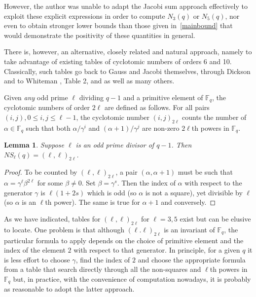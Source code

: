 \documentclass[12pt]{amsart}
\newtheorem{lemma}[thm]{Lemma}
\numberwithin{equation}{section}
\newcommand{\F}{\mathbb{F}_q}
\begin{document}
However, the author was unable to adapt the Jacobi sum approach effectively to exploit these explicit expressions in order to compute $N_3(q)$ or $N_5(q)$, nor even to obtain stronger lower bounds than those given in~\eqref{mainbound} that would demonstrate the positivity of these quantities in general.

There is, however, an alternative, closely related and natural approach, namely to take advantage of existing tables of cyclotomic numbers of orders 6 and 10.  Classically, such tables go back to Gauss and Jacobi  themselves, through Dickson \cite{Dic1935} and to Whiteman \cite{Whi1960}, Table 2,  and \cite{Whi1960a} as well as many others. 

Given {\em any}  odd prime $\ell$ dividing $q-1$  and a primitive element of $\F$, the cyclotomic numbers of order $2\ell$ are defined as follows. For all pairs $(i,j), 0 \le i,j \le \ell-1$, the cyclotomic number $(i,j)_{2\ell}$ counts the number of $\alpha \in \F$  such that both $\alpha/\gamma^i$ and $(\alpha +1)/\gamma^j$ are non-zero $2\ell$th powers in $\F$.
      
  \begin{lemma}\label{cyclnum}
 Suppose $\ell$ is an odd prime divisor of $q-1$. Then $NS_\ell(q)= (\ell,\ell)_{2\ell}$.
   \end{lemma}
 \begin{proof}
 To be counted by $(\ell, \ell)_{2\ell}$, a pair $(\alpha,\alpha+1)$ must be such that $\alpha=\gamma^\ell\beta^{2\ell}$ for some $\beta \ne 0$.  Set $\beta =\gamma^s$. Then the index of $\alpha$ with respect to the generator $\gamma$ is $\ell(1+2s)$ which is odd (so $\alpha$ is not a square), yet divisible by $\ell$ (so $\alpha$ is an $\ell$th power).  The same is true for $\alpha +1$ and conversely. 
 \end{proof}   
 
 As we have indicated, tables for $(\ell,\ell)_{2\ell}$ for $\ell=3,5$  exist but can be elusive to locate. One problem is that although $ (\ell.\ell)_{2\ell}$ is an invariant of $\F$, the particular formula to apply depends on the choice of primitive element and the index of the element $2$ with respect to that generator. In principle, for a given $q$ it is less effort to  choose $\gamma$, find the index of $2$ and choose the appropriate formula from a table that search directly through all the non-squares and $\ell$th powers in $\F$ but, in practice, with the convenience of computation nowadays, it is probably as reasonable to adopt the latter approach.
   
\end{document}
